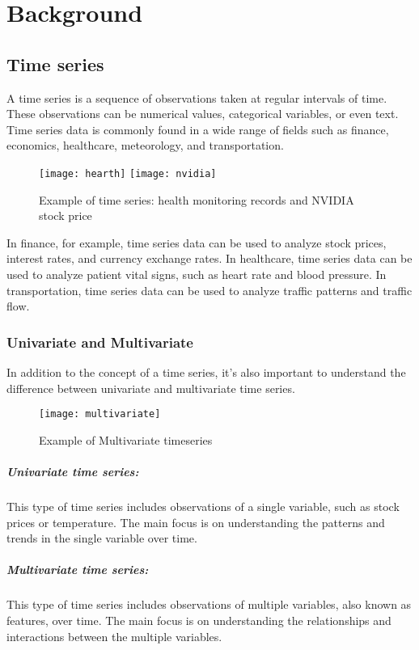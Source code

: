 \chapter{Background}

\section{Time series}
A time series is a sequence of observations taken at regular intervals of time.
These observations can be numerical values, categorical variables, or even text.
Time series data is commonly found in a wide range of fields such as finance, economics, healthcare, meteorology, and transportation.

\begin{figure}[H]
  \centering
  \texttt{[image: hearth]}
  \texttt{[image: nvidia]}
  \caption{Example of time series: health monitoring records \cite{influxdata} and NVIDIA stock price \cite{finance}}
\end{figure}

In finance, for example, time series data can be used to analyze stock prices, interest rates, and currency exchange rates.
In healthcare, time series data can be used to analyze patient vital signs, such as heart rate and blood pressure.
In transportation, time series data can be used to analyze traffic patterns and traffic flow.

\subsection{Univariate and Multivariate}

In addition to the concept of a time series, it's also important to understand the difference between univariate and multivariate time series.
\begin{figure}[H]
  \centering
  \texttt{[image: multivariate]}
  \caption{Example of Multivariate timeseries \cite{mltech}}
\end{figure}

\paragraph{Univariate time series:} This type of time series includes observations of a single variable, such as stock prices or temperature. The main focus is on understanding the patterns and trends in the single variable over time.
\paragraph{Multivariate time series:} This type of time series includes observations of multiple variables, also known as features, over time. The main focus is on understanding the relationships and interactions between the multiple variables.

